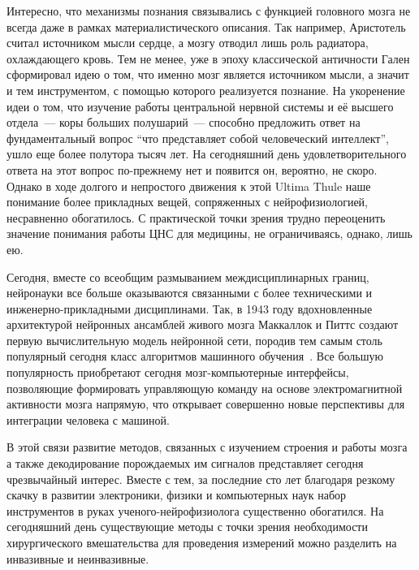 Интересно, что механизмы познания связывались с функцией головного мозга не
всегда даже в рамках материалистического описания. Так например, Аристотель
считал источником мысли сердце, а мозгу отводил лишь роль радиатора,
охлаждающего кровь. Тем не менее, уже в эпоху классической античности Гален
сформировал идею о том, что именно мозг является источником мысли, а значит и
тем инструментом, с помощью которого реализуется познание.  На укоренение идеи
о том, что изучение работы центральной нервной системы и её высшего отдела~---
коры больших полушарий~--- способно предложить ответ на фундаментальный вопрос
“что представляет собой человеческий интеллект”, ушло еще более полутора тысяч
лет.  На сегодняшний день удовлетворительного ответа на этот вопрос по-прежнему
нет и появится он, вероятно, не скоро. Однако в ходе  долгого и непростого
движения к этой Ultima Thule наше понимание более прикладных вещей, сопряженных
с нейрофизиологией, несравненно обогатилось.  С практической точки зрения
трудно переоценить значение понимания работы ЦНС для медицины, не
ограничиваясь, однако, лишь ею.

Сегодня, вместе со всеобщим размыванием междисциплинарных границ, нейронауки
все больше оказываются связанными с более техническими и инженерно-прикладными
дисциплинами.  Так, в 1943 году вдохновленные архитектурой нейронных ансамблей
живого мозга Маккаллок и Питтс создают первую вычислительную модель нейронной
сети, породив тем самым столь популярный сегодня класс алгоритмов машинного
обучения~\cite{McCulloch}. Все большую популярность приобретают сегодня
мозг-компьютерные интерфейсы, позволяющие формировать управляющую команду на
основе электромагнитной активности мозга напрямую, что открывает совершенно
новые перспективы для интеграции человека с машиной.


В этой связи развитие методов, связанных с изучением строения и работы мозга а
также декодирование порождаемых им сигналов представляет сегодня чрезвычайный
интерес.  Вместе с тем, за последние сто лет благодаря резкому скачку в
развитии электроники, физики и компьютерных наук набор инструментов в руках
ученого-нейрофизиолога существенно обогатился.  На сегодняшний день
существующие методы с точки зрения необходимости хирургического вмешательства
для проведения измерений можно разделить на инвазивные и неинвазивные.

